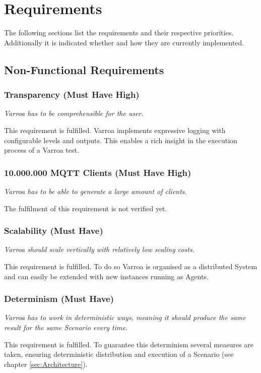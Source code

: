 \chapter{Requirements}
The following sections list the requirements and their respective priorities.
Additionally it is indicated whether and how they are currently implemented.

\section{Non-Functional Requirements}

\subsection{Transparency (Must Have High)}\label{sec:Transparency}
\emph{Varroa has to be comprehensible for the user.}

This requirement is fulfilled.
Varroa implements expressive logging with configurable levels and outputs.
This enables a rich insight in the execution process of a Varroa test.

\subsection{10.000.000 MQTT Clients (Must Have High)} 
\emph{Varroa has to be able to generate a large amount of clients.}

The fulfilment of this requirement is not verified yet.

\subsection{Scalability (Must Have)} 
\emph{Varroa should scale vertically with relatively low scaling costs.}

This requirement is fulfilled.
To do so Varroa is organised as a distributed System and can easily be extended with new instances running as Agents.

\subsection{Determinism (Must Have)} 
\emph{Varroa has to work in deterministic ways, meaning it should produce the same result for the same Scenario every time.}

This requirement is fulfilled.
To guarantee this determinism several measures are taken, ensuring deterministic distribution and execution of a Scenario (see chapter \ref{sec:Architecture}).

